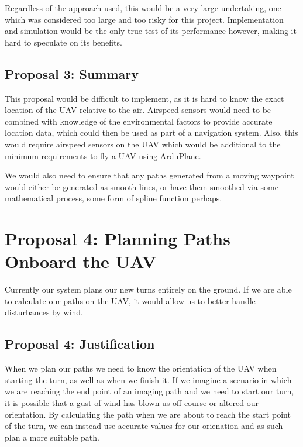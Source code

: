Regardless of the approach used, this would be a very large undertaking, one which was considered too large and too risky for this project. Implementation and simulation would be the only true test of its performance however, making it hard to speculate on its benefits.

\subsection{Proposal 3: Summary} 
\label{future:alternatedubinssummary}

This proposal would be difficult to implement, as it is hard to know the exact location of the UAV relative to the air. Airspeed sensors would need to be combined with knowledge of the environmental factors to provide accurate location data, which could then be used as part of a navigation system. Also, this would require airspeed sensors on the UAV which would be additional to the minimum requirements to fly a UAV using ArduPlane.

We would also need to ensure that any paths generated from a moving waypoint would either be generated as smooth lines, or have them smoothed via some mathematical process, some form of spline function perhaps.

\section{Proposal 4: Planning Paths Onboard the UAV} 
\label{future:onboard}

Currently our system plans our new turns entirely on the ground. If we are able to calculate our paths on the UAV, it would allow us to better handle disturbances by wind.

\subsection{Proposal 4: Justification}
\label{future:onboardreason}

When we plan our paths we need to know the orientation of the UAV when starting the turn, as well as when we finish it. If we imagine a scenario in which we are reaching the end point of an imaging path and we need to start our turn, it is possible that a gust of wind has blown us off course or altered our orientation. By calculating the path when we are about to reach the start point of the turn, we can instead use accurate values for our orienation and as such plan a more suitable path. 

